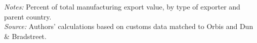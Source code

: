 \documentclass[11pt,a4paper]{article}
\begin{document}
\begin{table}[H]\centering\small%
  \caption{Manufacturing: Share of Total Exports, by Parent Country}%
  \label{tab:f4tn_manufacturing}%
  \par\vspace{3pt}%
  \begin{minipage}{0.95\textwidth}\footnotesize %
  \textit{Notes:} Percent of total manufacturing export value, by type of exporter and parent country.\\[3pt]%
  \textit{Source:} Authors' calculations based on customs data matched to Orbis and Dun \& Bradstreet.%
  \end{minipage}%
  \end{table}
\end{document}

